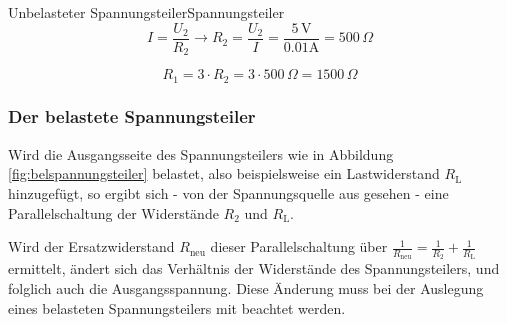 \begin{frame}
{\begin{bsp}{Unbelasteter Spannungsteiler}{Spannungsteiler}
\begin{equation*}
	I = \frac{U_2}{R_2} \rightarrow R_2 = \frac{U_2}{I} = \frac{5 \, \mathrm{V}}{0.01 \mathrm{A}} = 500 \, \Omega
\end{equation*}

\begin{equation*}
	R_1 = 3 \cdot R_2 = 3 \cdot 500 \, \Omega = 1500 \, \Omega
\end{equation*}




	
\end{bsp}

\subsubsection{Der belastete Spannungsteiler}

Wird die Ausgangsseite des Spannungsteilers wie in Abbildung \ref{fig:belspannungsteiler} belastet, also beispielsweise ein Lastwiderstand $R_\mathrm{L}$ hinzugefügt,
so ergibt sich - von der Spannungsquelle aus gesehen - eine Parallelschaltung der Widerstände $R_2$ und $R_\mathrm{L}$.

Wird der Ersatzwiderstand $R_\mathrm{neu}$ dieser Parallelschaltung über 
$\frac{1}{R_\mathrm{neu}} = \frac{1}{R_2} + \frac{1}{R_\mathrm{L}}$ ermittelt, ändert sich das Verhältnis der Widerstände des Spannungsteilers, 
und folglich auch die Ausgangsspannung. Diese Änderung muss bei der Auslegung eines belasteten Spannungsteilers mit beachtet werden.




\begin{figure}[h!]
	\begin{center}

\end{center}
\end{figure}}
\end{frame}
